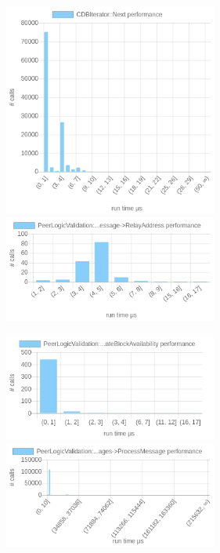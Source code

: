 \documentclass{article}
\begin{document}
\includegraphics[width=7cm]{images/london/chartCDBIterator_3A_3ANext.png}
\includegraphics[width=7cm]{images/london/chartPeerLogicValidation_3A_3AProcessMessages-_3EProcessMessage-_3ERelayAddress.png}

\includegraphics[width=7cm]{images/london/chartPeerLogicValidation_3A_3AProcessMessages-_3EProcessMessage-_3EUpdateBlockAvailability.png}
\includegraphics[width=7cm]{images/london/chartPeerLogicValidation_3A_3AProcessMessages-_3EProcessMessage.png}
\end{document}
